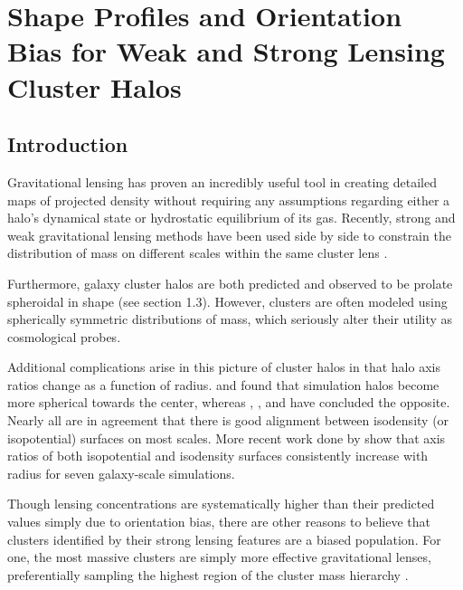 \chapter[Cluster Shape and Orientation]{Shape Profiles and Orientation Bias for Weak and Strong Lensing
  Cluster Halos}

\section{Introduction}

Gravitational lensing has proven an incredibly useful tool in
creating detailed maps of projected density without requiring any
assumptions regarding either a halo's dynamical state or hydrostatic
equilibrium of its gas. Recently, strong and weak 
gravitational lensing methods have been used side by side to constrain
the distribution of mass on different scales within the same cluster
lens \citep[for Abell 1689 for example, see][]{BroadhurstEtAl2005,HalkolaEtAl2006,DebEtAl2012}.    

Furthermore, galaxy cluster halos are both predicted and observed to be prolate spheroidal in
shape (see section 1.3). However, clusters are often modeled using spherically symmetric
distributions of mass, which seriously alter their utility as cosmological probes.


Additional complications arise in this picture of cluster halos in
that halo axis ratios change as a function of
radius. \citet{FrenkEtAl1988} and \citet{ColeLacey1996} found that
simulation halos become more spherical towards the center, whereas
\citet{DubinskiCarlberg1991}, \citet{WarrenEtAl1992}, and
\citet{JS2002} have concluded the opposite. Nearly all are in agreement
that there is good alignment between isodensity (or isopotential)
surfaces on most scales. More recent work done by
\citet{HayashiEtAl2007} show that axis ratios of both isopotential and
isodensity surfaces consistently increase with radius for seven
galaxy-scale simulations.   

Though lensing concentrations are systematically higher than their
predicted values simply due to orientation bias, there
are other reasons to believe that clusters identified by their strong
lensing features are a biased population. For one, the most massive
clusters are simply more effective gravitational lenses,
preferentially sampling the highest region of the cluster mass
hierarchy \citep{CN2007}.  

